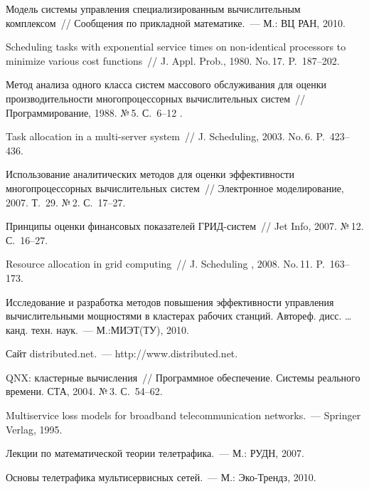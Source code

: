 \begin{multicols}{2}
{{\begin{thebibliography}{99}
Модель сис\-те\-мы управ\-ле\-ния специализированным вычислительным 
комплек\-сом~// Сообщения по прикладной математике.~--- М.: ВЦ РАН, 
2010.

Scheduling tasks with exponential service times on non-identical processors to 
minimize various cost functions~// J. Appl. Prob., 1980. No.\,17. P.~187--202. 


Метод анализа одного класса сис\-тем массового обслуживания для оценки 
производительности многопроцессорных вычислительных сис\-тем~// 
Программирование, 1988. №\,5. С.~6--12 . 

Task allocation in a multi-server system~// J. Scheduling, 2003. No.\,6. 
P.~423--436.

Использование аналитических методов для оценки эффективности 
многопроцессорных вычислительных сис\-тем~// Электронное 
моделирование, 2007. Т.~29. №\,2. С.~17--27. 

Принципы оценки финансовых показателей ГРИД-сис\-тем~// Jet Info, 2007. 
№\,12. С.~16--27. 

Resource allocation in grid computing~// J. Scheduling , 2008. No.\,11. 
P.~163--173.


Исследование и разработка методов повышения эффективности управления 
вы\-чис\-ли\-тель\-ны\-ми мощностями в кластерах рабочих станций. Автореф. 
дисс. \ldots канд. техн. наук.~--- М.:\linebreak МИЭТ(ТУ), 2010.

Сайт distributed.net.~--- {\sf http://www.distributed.net}. 

QNX: кластерные вычисления~// Программное обеспечение. Сис\-те\-мы 
реального времени. СТА, 2004. №\,3. С.~54--62. 

Multiservice loss models for broadband telecommunication networks.~--- 
Springer Verlag, 1995. 

Лекции по математической теории телетрафика.~--- М.: РУДН, 2007. 

Основы телетрафика мультисервисных сетей.~--- М.: Эко-Трендз, 2010. 




\end{thebibliography}}}
\end{multicols}
